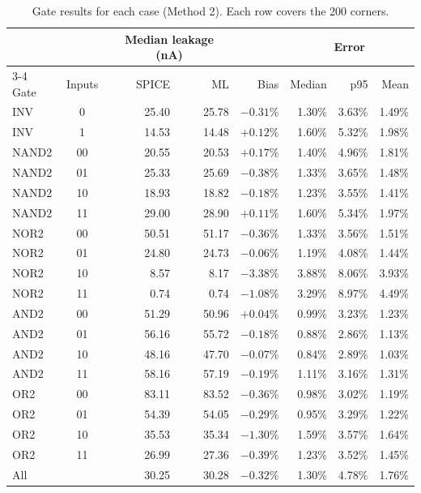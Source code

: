 \documentclass{article}
\begin{document}
\begin{table}[H]
\centering
\begin{tabular}{|l|c|r|r|r|r|r|r|}
\hline
     &        & \multicolumn{2}{c|}{Median leakage (nA)} & & \multicolumn{3}{c|}{Error} \\
\cline{3-4}\cline{6-8}
Gate & Inputs & SPICE & ML & Bias & Median & p95 & Mean \\
\hline
INV   & 0  & 25.40 & 25.78 & $-0.31\%$ & 1.30\% & 3.63\% & 1.49\% \\
INV   & 1  & 14.53 & 14.48 & $+0.12\%$ & 1.60\% & 5.32\% & 1.98\% \\
\hline
NAND2 & 00 & 20.55 & 20.53 & $+0.17\%$ & 1.40\% & 4.96\% & 1.81\% \\
NAND2 & 01 & 25.33 & 25.69 & $-0.38\%$ & 1.33\% & 3.65\% & 1.48\% \\
NAND2 & 10 & 18.93 & 18.82 & $-0.18\%$ & 1.23\% & 3.55\% & 1.41\% \\
NAND2 & 11 & 29.00 & 28.90 & $+0.11\%$ & 1.60\% & 5.34\% & 1.97\% \\
\hline
NOR2  & 00 & 50.51 & 51.17 & $-0.36\%$ & 1.33\% & 3.56\% & 1.51\% \\
NOR2  & 01 & 24.80 & 24.73 & $-0.06\%$ & 1.19\% & 4.08\% & 1.44\% \\
NOR2  & 10 & 8.57  & 8.17  & $-3.38\%$ & 3.88\% & 8.06\% & 3.93\% \\
NOR2  & 11 & 0.74  & 0.74  & $-1.08\%$ & 3.29\% & 8.97\% & 4.49\% \\
\hline
AND2  & 00 & 51.29 & 50.96 & $+0.04\%$ & 0.99\% & 3.23\% & 1.23\% \\
AND2  & 01 & 56.16 & 55.72 & $-0.18\%$ & 0.88\% & 2.86\% & 1.13\% \\
AND2  & 10 & 48.16 & 47.70 & $-0.07\%$ & 0.84\% & 2.89\% & 1.03\% \\
AND2  & 11 & 58.16 & 57.19 & $-0.19\%$ & 1.11\% & 3.16\% & 1.31\% \\
\hline
OR2   & 00 & 83.11 & 83.52 & $-0.36\%$ & 0.98\% & 3.02\% & 1.19\% \\
OR2   & 01 & 54.39 & 54.05 & $-0.29\%$ & 0.95\% & 3.29\% & 1.22\% \\
OR2   & 10 & 35.53 & 35.34 & $-1.30\%$ & 1.59\% & 3.57\% & 1.64\% \\
OR2   & 11 & 26.99 & 27.36 & $-0.39\%$ & 1.23\% & 3.52\% & 1.45\% \\
\hline
All   &    & 30.25 & 30.28 & $-0.32\%$ & 1.30\% & 4.78\% & 1.76\% \\
\hline
\end{tabular}
\caption{Gate results for each case (Method 2). Each row covers the 200
corners.}
\label{tab:gateresults}
\end{table}
\end{document}
